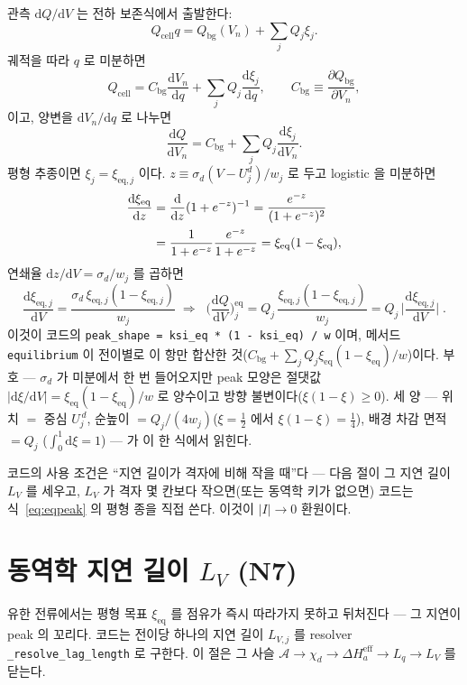 \documentclass[11pt,a4paper]{article}
\newcommand{\dd}{\mathrm{d}}
\newcommand{\eff}{\mathrm{eff}}
\newcommand{\eq}{\mathrm{eq}}
\newcommand{\cell}{\mathrm{cell}}
\newcommand{\bg}{\mathrm{bg}}
\newcommand{\code}[1]{\texttt{#1}}
\begin{document}
관측 $\dd Q/\dd V$ 는 전하 보존식에서 출발한다:
\begin{equation}
Q_\cell q=Q_\bg(V_n)+\sum_jQ_j\xi_j.
\label{eq:charge_v809}
\end{equation}
궤적을 따라 $q$ 로 미분하면
\begin{equation}
Q_\cell=C_\bg\frac{\dd V_n}{\dd q}+\sum_jQ_j\frac{\dd\xi_j}{\dd q},
\qquad C_\bg\equiv\frac{\partial Q_\bg}{\partial V_n},
\label{eq:charge_deriv_v809}
\end{equation}
이고, 양변을 $\dd V_n/\dd q$ 로 나누면
\begin{equation}
\frac{\dd Q}{\dd V_n}
=C_\bg+\sum_jQ_j\frac{\dd\xi_j}{\dd V_n}.
\label{eq:dqdv_chain_v809}
\end{equation}
평형 추종이면 $\xi_j=\xi_{\eq,j}$ 이다. $z\equiv\sigma_d(V-U_j^d)/w_j$ 로 두고 logistic 을 미분하면
\begin{align}
\frac{\dd\xi_\eq}{\dd z}
&=\frac{\dd}{\dd z}(1+e^{-z})^{-1}
=\frac{e^{-z}}{(1+e^{-z})^2}\notag\\
&=\frac{1}{1+e^{-z}}\frac{e^{-z}}{1+e^{-z}}
=\xi_\eq(1-\xi_\eq),
\label{eq:bell_identity_v809}
\end{align}
연쇄율 $\dd z/\dd V=\sigma_d/w_j$ 를 곱하면
\begin{equation}
\frac{\dd\xi_{\eq,j}}{\dd V}=\frac{\sigma_d\,\xi_{\eq,j}(1-\xi_{\eq,j})}{w_j}
\;\Longrightarrow\;
\boxed{\;\Big(\frac{\dd Q}{\dd V}\Big)^\eq_j
=Q_j\,\frac{\xi_{\eq,j}(1-\xi_{\eq,j})}{w_j}
=Q_j\,\Big|\frac{\dd\xi_{\eq,j}}{\dd V}\Big|\;.}
\label{eq:eqpeak}
\end{equation}
이것이 코드의 \code{peak\_shape = ksi\_eq * (1 - ksi\_eq) / w} 이며, 메서드 \code{equilibrium} 이 전이별로 이 항만
합산한 것($C_\bg+\sum_jQ_j\xi_\eq(1-\xi_\eq)/w$)이다. 부호 — $\sigma_d$ 가 미분에서 한 번 들어오지만 peak 모양은
절댓값 $|\dd\xi/\dd V|=\xi_\eq(1-\xi_\eq)/w$ 로 양수이고 방향 불변이다($\xi(1-\xi)\ge0$). 세 양 — 위치 $=$ 중심
$U_j^{\,d}$, 순높이 $=Q_j/(4w_j)$($\xi=\tfrac12$ 에서 $\xi(1-\xi)=\tfrac14$), 배경 차감 면적 $=Q_j$
($\int_0^1\dd\xi=1$) — 가 이 한 식에서 읽힌다.

코드의 사용 조건은 ``지연 길이가 격자에 비해 작을 때''다 — 다음 절이 그 지연 길이 $L_V$ 를 세우고, $L_V$ 가 격자
몇 칸보다 작으면(또는 동역학 키가 없으면) 코드는 식~\eqref{eq:eqpeak} 의 평형 종을 직접 쓴다. 이것이 $|I|\to0$ 환원이다.

\section{동역학 지연 길이 $L_V$ (N7)}\label{sec:lag}
유한 전류에서는 평형 목표 $\xi_\eq$ 를 점유가 즉시 따라가지 못하고 뒤처진다 — 그 지연이 peak 의 꼬리다. 코드는 전이당
하나의 지연 길이 $L_{V,j}$ 를 resolver \code{\_resolve\_lag\_length} 로 구한다. 이 절은 그 사슬
$\mathcal A\to\chi_d\to\Delta H_a^\eff\to L_q\to L_V$ 를 닫는다.
\end{document}
